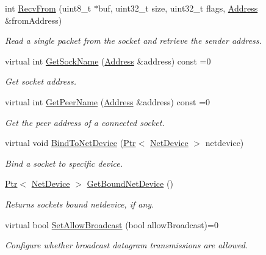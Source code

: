 \begin{DoxyCompactItemize}
int \hyperlink{classns3_1_1Socket_a8779342fecd9aede4890070783dd8c67}{Recv\+From} (uint8\+\_\+t $\ast$buf, uint32\+\_\+t size, uint32\+\_\+t flags, \hyperlink{classns3_1_1Address}{Address} \&from\+Address)
\begin{DoxyCompactList}\small\item\em Read a single packet from the socket and retrieve the sender address. \end{DoxyCompactList}\item 
virtual int \hyperlink{classns3_1_1Socket_aa982ca9baab28bea412b0d9710e63b43}{Get\+Sock\+Name} (\hyperlink{classns3_1_1Address}{Address} \&address) const =0
\begin{DoxyCompactList}\small\item\em Get socket address. \end{DoxyCompactList}\item 
virtual int \hyperlink{classns3_1_1Socket_a78a3c37a539d2e70869bb82cc60fbb09}{Get\+Peer\+Name} (\hyperlink{classns3_1_1Address}{Address} \&address) const =0
\begin{DoxyCompactList}\small\item\em Get the peer address of a connected socket. \end{DoxyCompactList}\item 
virtual void \hyperlink{classns3_1_1Socket_a9952cd10a2c8c108846027108cc9e44e}{Bind\+To\+Net\+Device} (\hyperlink{classns3_1_1Ptr}{Ptr}$<$ \hyperlink{classns3_1_1NetDevice}{Net\+Device} $>$ netdevice)
\begin{DoxyCompactList}\small\item\em Bind a socket to specific device. \end{DoxyCompactList}\item 
\hyperlink{classns3_1_1Ptr}{Ptr}$<$ \hyperlink{classns3_1_1NetDevice}{Net\+Device} $>$ \hyperlink{classns3_1_1Socket_a04ae6be2aded03caaa262e274dc8a2fd}{Get\+Bound\+Net\+Device} ()
\begin{DoxyCompactList}\small\item\em Returns socket\textquotesingle{}s bound netdevice, if any. \end{DoxyCompactList}\item 
virtual bool \hyperlink{classns3_1_1Socket_a32b4fa27b732a63207c8d9054a817ed5}{Set\+Allow\+Broadcast} (bool allow\+Broadcast)=0
\begin{DoxyCompactList}\small\item\em Configure whether broadcast datagram transmissions are allowed. \end{DoxyCompactList}\item 

\end{DoxyCompactItemize}
